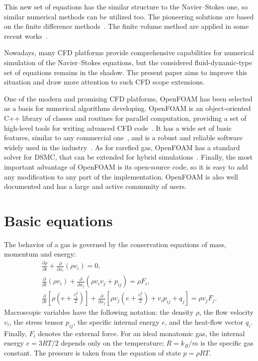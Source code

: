 \documentclass[smallextended, referee]{svjour3} %
\newcommand{\pder}[2][]{\frac{\partial#1}{\partial#2}}
\begin{document}
This new set of equations has the similar structure to the Navier--Stokes one,
so similar numerical methods can be utilized too.
The pioneering solutions are based on the finite difference methods~\cite{GhostEffect, Kogan1976}.
The finite volume method are applied in some recent works~\cite{Laneryd2006, Laneryd2007}.

Nowadays, many CFD platforms provide comprehensive
capabilities for numerical simulation of the Navier--Stokes equations,
but the considered fluid-dynamic-type set of equations remains in the shadow.
The present paper aims to improve this situation and
draw more attention to such CFD scope extensions.

One of the modern and promising CFD platforms, OpenFOAM\textregistered{}
has been selected as a basis for numerical algorithms developing.
OpenFOAM\textregistered{} is an object-oriented C++ library of classes and routines for parallel computation,
providing a set of high-level tools for writing advanced CFD code~\cite{OpenFOAM1998}.
It has a wide set of basic features, similar to any commercial one~\cite{OpenFOAM2010},
and is a robust and reliable software widely used in the industry~\cite{BoilingFlows2009,
TurbulentCombustion2011, CoastalEngineering2013, BiomassPyrolysis2013}.
As for rarefied gas, OpenFOAM\textregistered{} has a standard solver for DSMC, that
can be extended for hybrid simulations~\cite{HybridSolver2012}.
Finally, the most important advantage of OpenFOAM\textregistered{} is its open-source code,
so it is easy to add any modification to any part of the implementation.
OpenFOAM\textregistered{} is also well documented and has a large and active community of users.

\section{Basic equations}

The behavior of a gas is governed by the conservation equations of mass, momentum and energy:
\begin{gather}
	\pder[\rho]{t} + \pder{x_i}(\rho v_i) = 0, \label{eq:mass}\\
	\pder{t}(\rho v_i) + \pder{x_j}(\rho v_i v_j + p_{ij}) = \rho F_i, \label{eq:momentum}\\
	\pder{t}\left[\rho\left(e+\frac{v_i^2}2\right)\right] +
		\pder{x_j}\left[\rho v_j\left(e+\frac{v_i^2}2\right)+v_i p_{ij}+q_j\right] = \rho v_j F_j. \label{eq:energy}
\end{gather}
Macroscopic variables have the following notation: the density \(\rho\), the flow velocity \(v_i\),
the stress tensor \(p_{ij}\), the specific internal energy \(e\), and the heat-flow vector \(q_i\).
Finally, \(F_i\) denotes the external force.
For an ideal monatomic gas, the internal energy \(e = 3RT/2\) depends only on the temperature;
\(R = k_B / m\) is the specific gas constant.
The pressure is taken from the equation of state \( p = \rho RT \).
\end{document}
